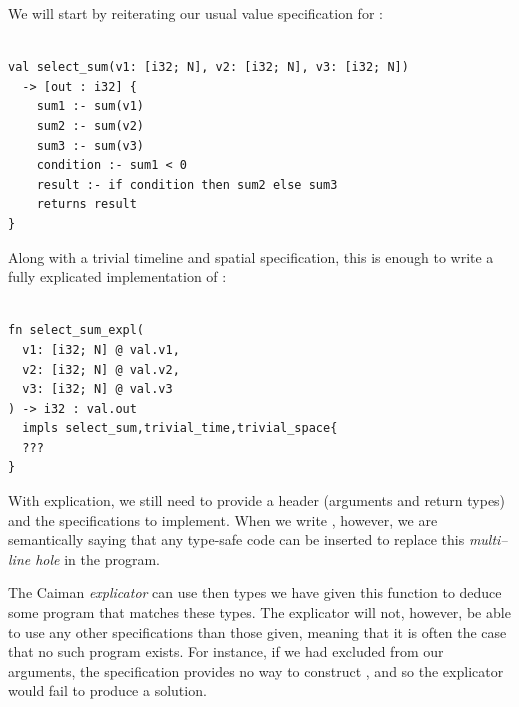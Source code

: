 We will start by reiterating our usual value specification for :
%
\begin{lstlisting}

val select_sum(v1: [i32; N], v2: [i32; N], v3: [i32; N]) 
  -> [out : i32] {
    sum1 :- sum(v1)
    sum2 :- sum(v2)
    sum3 :- sum(v3)
    condition :- sum1 < 0
    result :- if condition then sum2 else sum3
    returns result
}
\end{lstlisting}
%
Along with a trivial timeline and spatial specification, this is enough to write a fully explicated implementation of :
%
\begin{lstlisting}

fn select_sum_expl(
  v1: [i32; N] @ val.v1,
  v2: [i32; N] @ val.v2,
  v3: [i32; N] @ val.v3
) -> i32 : val.out 
  impls select_sum,trivial_time,trivial_space{
  ???
}
\end{lstlisting}
%
With explication, we still need to provide a header (arguments and return types) and the specifications to implement.  When we write , however, we are semantically saying that any type-safe code can be inserted to replace this \emph{multi--line hole} in the program.

The Caiman \emph{explicator} can use then types we have given this function to deduce some program that matches these types.  The explicator will not, however, be able to use any other specifications than those given, meaning that it is often the case that no such program exists.  For instance, if we had excluded  from our arguments, the  specification provides no way to construct , and so the explicator would fail to produce a solution.

